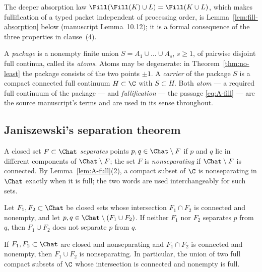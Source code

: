The deeper absorption law
$\Fill(\Fill(K)\cup L)=\Fill(K\cup L)$, which makes fullification of a
typed packet independent of processing order, is
Lemma~\ref{lem:fill-absorption} below (manuscript Lemma~10.12); it is a
formal consequence of the three properties in clause~(4).

\begin{definition}
\label{def:A-package}
A \emph{package} is a nonempty finite union
$S=A_1\cup\dots\cup A_s$, $s\ge1$, of pairwise disjoint full continua,
called its \emph{atoms}.  Atoms may be
degenerate: in Theorem~\ref{thm:no-least} the package consists of the two
points $\pm1$.  A \emph{carrier} of the package $S$ is a compact
connected full continuum $H\subset\C$ with $S\subset H$.  Both
\emph{atom} --- a required full continuum of the package --- and
\emph{fullification} --- the passage \eqref{eq:A-fill} --- are the source
manuscript's terms \cite{MWman} and are used in its sense throughout.
\end{definition}

\subsection{Janiszewski's separation theorem}\label{subsec:A-janiszewski}

A closed set $F\subset\Chat$ \emph{separates} points
$p,q\in\Chat\setminus F$ if $p$ and $q$ lie in different components of
$\Chat\setminus F$; the set $F$ is \emph{nonseparating} if
$\Chat\setminus F$ is connected.  By Lemma~\ref{lem:A-full}(2), a compact
subset of $\C$ is nonseparating in $\Chat$ exactly when it is full; the
two words are used interchangeably for such sets.

\begin{theorem}
\label{thm:A-janiszewski}
Let $F_1,F_2\subset\Chat$ be closed sets whose intersection
$F_1\cap F_2$ is connected and nonempty, and let
$p,q\in\Chat\setminus(F_1\cup F_2)$.  If neither $F_1$ nor $F_2$
separates $p$ from $q$, then $F_1\cup F_2$ does not separate $p$ from
$q$.
\end{theorem}

\begin{corollary}\label{cor:A-janiszewski}
If $F_1,F_2\subset\Chat$ are closed and nonseparating and
$F_1\cap F_2$ is connected and nonempty, then $F_1\cup F_2$ is
nonseparating.  In particular, the union of two full compact subsets of
$\C$ whose intersection is connected and nonempty is full.
\end{corollary}

